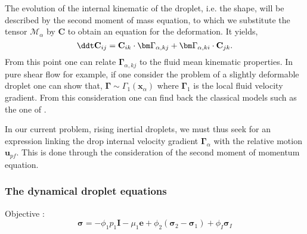 The evolution of the internal kinematic of the droplet, i.e. the shape, will be described by the second moment of mass equation, to which we substitute the tensor $\mathcal{M}_\alpha$ by \textbf{C} to obtain an equation for the deformation. 
It yields, 
\begin{equation*}
    \ddt \textbf{C}_{ij}
    = \textbf{C}_{ik} \cdot \bm\Gamma_{\alpha,kj}
    +  \bm\Gamma_{\alpha,ki} \cdot \textbf{C}_{jk}.
    \label{eq:dt_C}
\end{equation*}
From this point one can relate $\bm\Gamma_{\alpha,kj}$ to the fluid mean kinematic properties. 
In pure shear flow for example, if one consider the problem of a slightly deformable droplet one can show that, $\bm\Gamma \sim \Gamma_1(\textbf{x}_\alpha)$ where $\bm\Gamma_1$ is the local fluid velocity gradient.
From this consideration one can find back the classical models such as the one of  \citet{maffettone1998equation,schowalter1968rheological}. 

In our current problem, rising inertial droplets, we must thus seek for an expression linking the drop internal velocity gradient $\bm\Gamma_\alpha$ with the relative motion $\textbf{u}_{pf}$. 
This is done through the consideration of the second moment of momentum equation. 

\subsubsection*{The dynamical droplet equations}

Objective : 
\begin{equation*}
    \bm\sigma 
    = 
    - \phi_1 p_1 \textbf{I}
    - \mu_1 \textbf{e}
    + \phi_2(\bm\sigma_2 - \bm\sigma_1)
    + \phi_I\bm\sigma_I
\end{equation*}


